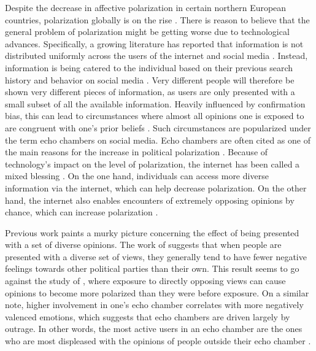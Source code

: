 \documentclass[11pt]{article}
\begin{document}
\noindent Despite the decrease in affective polarization in certain northern European countries, polarization globally is on the rise \cite{boxell_cross-country_2020,mccoy_polarization_2018, somer_deja_2018}. There is reason to believe that the general problem of polarization might be getting worse due to technological advances.
Specifically, a growing literature has reported that information is not distributed uniformly across the users of the internet and social media \cite{taylor_exploring_2018, sasahara_social_2021,baumann_modeling_2020,tsai_echo_2020}. Instead, information is being catered to the individual based on their previous search history and behavior on social media \cite{geschke2019triple}. Very different people will therefore be shown very different pieces of information, as users are only presented with a small subset of all the available information. 
Heavily influenced by confirmation bias, this can lead to circumstances where almost all opinions one is exposed to are congruent with one's prior beliefs \cite{baumann_modeling_2020}. Such circumstances are popularized under the term echo chambers on social media. Echo chambers are often cited as one of the main reasons for the increase in political polarization \cite{baumann_modeling_2020, sasahara_social_2021, tsai_echo_2020, geschke2019triple}. 
Because of technology's impact on the level of polarization, the internet has been called a mixed blessing \cite{lev-on_happy_2009}. On the one hand, individuals can access more diverse information via the internet, which can help decrease polarization. On the other hand, the internet also enables encounters of extremely opposing opinions by chance, which can increase polarization \cite{lev-on_happy_2009}.

Previous work paints a murky picture concerning the effect of being presented with a set of diverse opinions. The work of  suggests that when people are presented with a diverse set of views, they generally tend to have fewer negative feelings towards other political parties than their own. This result seems to go against the study of , where exposure to directly opposing views can cause opinions to become more polarized than they were before exposure. 
On a similar note, higher involvement in one's echo chamber correlates with more negatively valenced emotions, which suggests that echo chambers are driven largely by outrage. In other words, the most active users in an echo chamber are the ones who are most displeased with the opinions of people outside their echo chamber \cite{del_vicario_echo_2016}.
\end{document}
